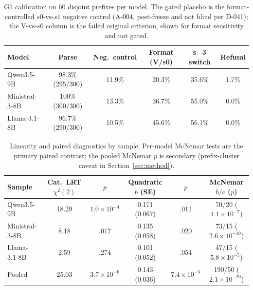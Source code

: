 \documentclass[a4paper,fleqn]{cas-sc}
\begin{document}
\begin{table}[pos=htbp]
  \centering
  \caption{G1 calibration on 60 disjoint prefixes per model. The gated placebo is the
  format-controlled $s0$-vs-$s1$ negative control (A-004, post-freeze and not blind per D-041);
  the V-vs-$s0$ column is the failed original criterion, shown for format sensitivity and not gated.}
  \label{tab:g1}
  \small
  \begin{tabular}{lccccc}
    \toprule
    \textbf{Model} & \textbf{Parse} & \textbf{Neg.\ control} & \textbf{Format (V/s0)} & \textbf{s=3 switch} & \textbf{Refusal} \\
    \midrule
    Qwen3.5-9B     & 98.3\% (295/300) & 11.9\% & 20.3\% & 35.6\% & 1.7\% \\
    Ministral-3-8B & 100\% (300/300)  & 13.3\% & 36.7\% & 55.0\% & 0.0\% \\
    Llama-3.1-8B   & 96.7\% (290/300) & 10.5\% & 45.6\% & 56.1\% & 0.0\% \\
    \bottomrule
  \end{tabular}
\end{table}

\begin{table}[pos=htbp]
  \centering
  \caption{Linearity and paired diagnostics by sample. Per-model McNemar tests are the
  primary paired contrast; the pooled McNemar $p$ is secondary (prefix-cluster caveat in
  Section~\ref{sec:method}).}
  \label{tab:diagnostics}
  \footnotesize
  \setlength{\tabcolsep}{4pt}
  \begin{tabular}{lccccc}
    \toprule
    \textbf{Sample} & \textbf{Cat.\ LRT $\chi^2(2)$} & \textbf{$p$} & \textbf{Quadratic $b$ (SE)} & \textbf{$p$} & \textbf{McNemar $b/c$ ($p$)} \\
    \midrule
    Qwen3.5-9B     & 18.29 & $1.0\times10^{-4}$ & 0.171 (0.067) & .011 & 70/20 ($1.1\times10^{-7}$) \\
    Ministral-3-8B & 8.18  & .017               & 0.135 (0.058) & .020 & 73/15 ($2.6\times10^{-10}$) \\
    Llama-3.1-8B   & 2.59  & .274               & 0.101 (0.052) & .054 & 47/15 ($5.8\times10^{-5}$) \\
    \midrule
    Pooled         & 25.03 & $3.7\times10^{-6}$ & 0.143 (0.036) & $7.4\times10^{-5}$ & 190/50 ($2.1\times10^{-20}$) \\
    \bottomrule
  \end{tabular}
\end{table}
\end{document}
